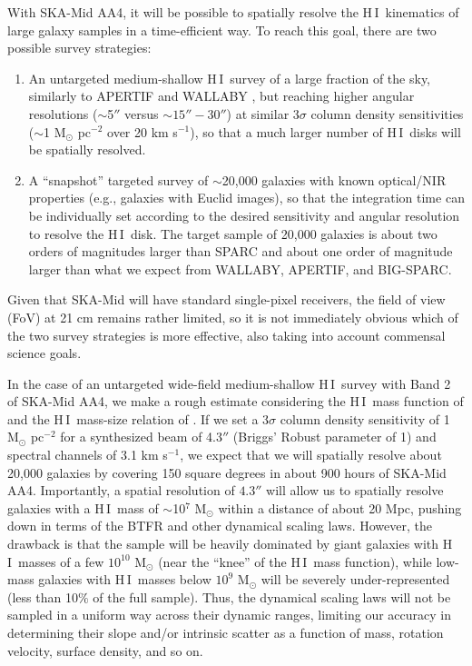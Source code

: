 \documentclass[a4paper,11pt]{article}
\newcommand{\hi } {{\rm H}\,{\small\rm I}}
\begin{document}
With SKA-Mid AA4, it will be possible to spatially resolve the \hi\ kinematics of large galaxy samples in a time-efficient way. To reach this goal, there are two possible survey strategies: 
\begin{enumerate}
    \item An untargeted medium-shallow \hi\ survey of a large fraction of the sky, similarly to APERTIF \citep{Adams2022} and WALLABY \citep{Westmeier2022}, but reaching higher angular resolutions ($\sim$5$''$ versus $\sim15''-30''$) at similar 3$\sigma$ column density sensitivities ($\sim$1 M$_\odot$ pc$^{-2}$ over 20 km s$^{-1}$), so that a much larger number of \hi\ disks will be spatially resolved.
    \item A ``snapshot'' targeted survey of $\sim$20,000 galaxies with known optical/NIR properties (e.g., galaxies with Euclid images), so that the integration time can be individually set according to the desired sensitivity and angular resolution to resolve the \hi\ disk. The target sample of 20,000 galaxies is about two orders of magnitudes larger than SPARC and about one order of magnitude larger than what we expect from WALLABY, APERTIF, and BIG-SPARC.
\end{enumerate}
Given that SKA-Mid will have standard single-pixel receivers, the field of view (FoV) at 21 cm remains rather limited, so it is not immediately obvious which of the two survey strategies is more effective, also taking into account commensal science goals.

In the case of an untargeted wide-field medium-shallow \hi\ survey with Band 2 of SKA-Mid AA4, we make a rough estimate considering the \hi\ mass function of \citet{Jones2018} and the \hi\ mass-size relation of \citet{Wang2016}. If we set a 3$\sigma$ column density sensitivity of 1 M$_\odot$ pc$^{-2}$ for a synthesized beam of 4.3$''$ (Briggs' Robust parameter of 1) and spectral channels of 3.1 km s$^{-1}$, we expect that we will spatially resolve about 20,000 galaxies by covering 150 square degrees in about 900 hours of SKA-Mid AA4. Importantly, a spatial resolution of $4.3''$ will allow us to spatially resolve galaxies with a \hi\ mass of $\sim$10$^7$ M$_\odot$ within a distance of about 20 Mpc, pushing down in terms of the BTFR and other dynamical scaling laws. However, the drawback is that the sample will be heavily dominated by giant galaxies with \hi\ masses of a few $10^{10}$ M$_\odot$ (near the ``knee'' of the \hi\ mass function), while low-mass galaxies with \hi\ masses below $10^9$ M$_\odot$ will be severely under-represented (less than 10$\%$ of the full sample). Thus, the dynamical scaling laws will not be sampled in a uniform way across their dynamic ranges, limiting our accuracy in determining their slope and/or intrinsic scatter as a function of mass, rotation velocity, surface density, and so on.
\end{document}
